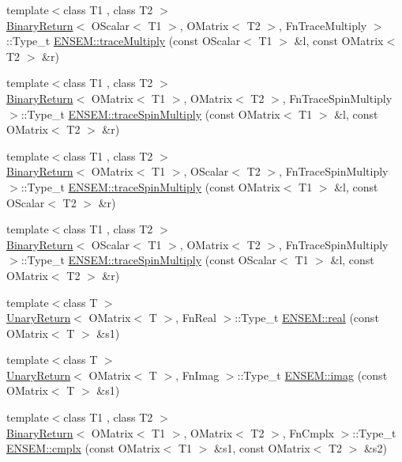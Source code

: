 \begin{DoxyCompactItemize}
\item 
{\footnotesize template$<$class T1 , class T2 $>$ }\\\mbox{\hyperlink{structBinaryReturn}{Binary\+Return}}$<$ O\+Scalar$<$ T1 $>$, O\+Matrix$<$ T2 $>$, Fn\+Trace\+Multiply $>$\+::Type\+\_\+t \mbox{\hyperlink{group__obsmatrix_gab9e4e0bccae4aa80554908fd966782e1}{E\+N\+S\+E\+M\+::trace\+Multiply}} (const O\+Scalar$<$ T1 $>$ \&l, const O\+Matrix$<$ T2 $>$ \&r)
\item 
{\footnotesize template$<$class T1 , class T2 $>$ }\\\mbox{\hyperlink{structBinaryReturn}{Binary\+Return}}$<$ O\+Matrix$<$ T1 $>$, O\+Matrix$<$ T2 $>$, Fn\+Trace\+Spin\+Multiply $>$\+::Type\+\_\+t \mbox{\hyperlink{group__obsmatrix_gabff96ae04e02659ddc78f25a8d61bf61}{E\+N\+S\+E\+M\+::trace\+Spin\+Multiply}} (const O\+Matrix$<$ T1 $>$ \&l, const O\+Matrix$<$ T2 $>$ \&r)
\item 
{\footnotesize template$<$class T1 , class T2 $>$ }\\\mbox{\hyperlink{structBinaryReturn}{Binary\+Return}}$<$ O\+Matrix$<$ T1 $>$, O\+Scalar$<$ T2 $>$, Fn\+Trace\+Spin\+Multiply $>$\+::Type\+\_\+t \mbox{\hyperlink{group__obsmatrix_gaff573e35e3b3904f735317f67cae28f6}{E\+N\+S\+E\+M\+::trace\+Spin\+Multiply}} (const O\+Matrix$<$ T1 $>$ \&l, const O\+Scalar$<$ T2 $>$ \&r)
\item 
{\footnotesize template$<$class T1 , class T2 $>$ }\\\mbox{\hyperlink{structBinaryReturn}{Binary\+Return}}$<$ O\+Scalar$<$ T1 $>$, O\+Matrix$<$ T2 $>$, Fn\+Trace\+Spin\+Multiply $>$\+::Type\+\_\+t \mbox{\hyperlink{group__obsmatrix_gaa152d77bf9e2e211ff35c733b40f6c64}{E\+N\+S\+E\+M\+::trace\+Spin\+Multiply}} (const O\+Scalar$<$ T1 $>$ \&l, const O\+Matrix$<$ T2 $>$ \&r)
\item 
{\footnotesize template$<$class T $>$ }\\\mbox{\hyperlink{structUnaryReturn}{Unary\+Return}}$<$ O\+Matrix$<$ T $>$, Fn\+Real $>$\+::Type\+\_\+t \mbox{\hyperlink{group__obsmatrix_gaa89ce5a88c3ccb5020ce1319e041cacd}{E\+N\+S\+E\+M\+::real}} (const O\+Matrix$<$ T $>$ \&s1)
\item 
{\footnotesize template$<$class T $>$ }\\\mbox{\hyperlink{structUnaryReturn}{Unary\+Return}}$<$ O\+Matrix$<$ T $>$, Fn\+Imag $>$\+::Type\+\_\+t \mbox{\hyperlink{group__obsmatrix_ga227c6429f15ec19a09a182551be38dad}{E\+N\+S\+E\+M\+::imag}} (const O\+Matrix$<$ T $>$ \&s1)
\item 
{\footnotesize template$<$class T1 , class T2 $>$ }\\\mbox{\hyperlink{structBinaryReturn}{Binary\+Return}}$<$ O\+Matrix$<$ T1 $>$, O\+Matrix$<$ T2 $>$, Fn\+Cmplx $>$\+::Type\+\_\+t \mbox{\hyperlink{group__obsmatrix_ga28de8e5b7b3d990424b77f7d9eeb2ec1}{E\+N\+S\+E\+M\+::cmplx}} (const O\+Matrix$<$ T1 $>$ \&s1, const O\+Matrix$<$ T2 $>$ \&s2)

\end{DoxyCompactItemize}
